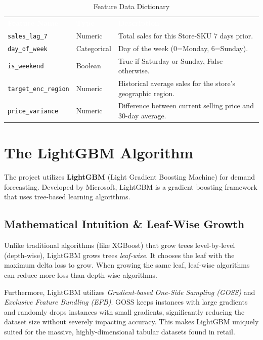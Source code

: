 \documentclass[12pt,a4paper]{report}
\begin{document}
\begin{table}[h]
\centering
\renewcommand{\arraystretch}{1.5}
\caption{Feature Data Dictionary}
\begin{tabularx}{\textwidth}{>{\hsize=0.3\hsize}X >{\hsize=0.2\hsize}X >{\hsize=0.5\hsize}X}
\rowcolor{zidiopurple}
\textcolor{white}{\textbf{Feature Name}} & \textcolor{white}{\textbf{Type}} & \textcolor{white}{\textbf{Description}} \\
\rowcolor{zidiogray!30}
\texttt{sales\_lag\_7} & Numeric & Total sales for this Store-SKU 7 days prior. \\
\texttt{day\_of\_week} & Categorical & Day of the week (0=Monday, 6=Sunday). \\
\rowcolor{zidiogray!30}
\texttt{is\_weekend} & Boolean & True if Saturday or Sunday, False otherwise. \\
\texttt{target\_enc\_region} & Numeric & Historical average sales for the store's geographic region. \\
\rowcolor{zidiogray!30}
\texttt{price\_variance} & Numeric & Difference between current selling price and 30-day average. \\
\end{tabularx}
\end{table}

\section{The LightGBM Algorithm}
The project utilizes \textbf{LightGBM} (Light Gradient Boosting Machine) for demand forecasting. Developed by Microsoft, LightGBM is a gradient boosting framework that uses tree-based learning algorithms.

\subsection{Mathematical Intuition \& Leaf-Wise Growth}
Unlike traditional algorithms (like XGBoost) that grow trees level-by-level (depth-wise), LightGBM grows trees \textit{leaf-wise}. It chooses the leaf with the maximum delta loss to grow. When growing the same leaf, leaf-wise algorithms can reduce more loss than depth-wise algorithms.

Furthermore, LightGBM utilizes \textit{Gradient-based One-Side Sampling (GOSS)} and \textit{Exclusive Feature Bundling (EFB)}. GOSS keeps instances with large gradients and randomly drops instances with small gradients, significantly reducing the dataset size without severely impacting accuracy. This makes LightGBM uniquely suited for the massive, highly-dimensional tabular datasets found in retail.
\end{document}
